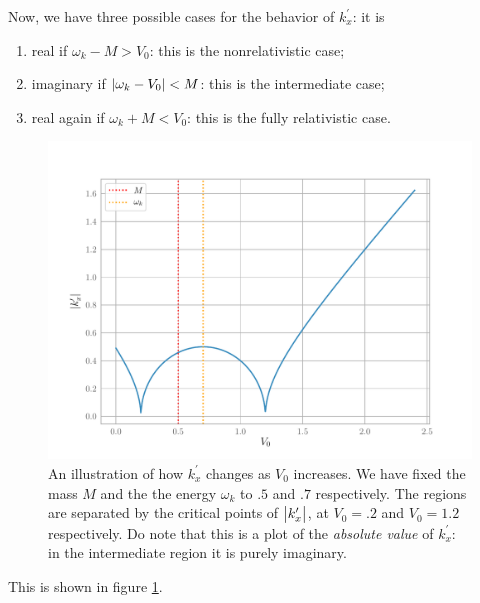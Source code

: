 \documentclass[main.tex]{subfiles}
\begin{document}
Now, we have three possible cases for the behavior of \(k_x^{\prime }\): it is 
\begin{enumerate}
  \item real if \(\omega_{k} - M > V_0 \): this is the nonrelativistic case;
  \item imaginary if \(\abs{\omega_{k} - V_0 } < M\): this is the intermediate case;
  \item real again if \(\omega_{k} + M < V_0 \): this is the fully relativistic case.
\end{enumerate}

\begin{figure}[ht]
\centering
\includegraphics[width=\textwidth]{figures/primed_momentum_potential.pdf}
\caption{An illustration of how \(k_x^{\prime }\) changes as \(V_0 \) increases. We have fixed the mass \(M\) and the the energy \(\omega_{k}\) to \(\num{.5}\) and \(\num{.7}\) respectively. The regions are separated by the critical points of \(\abs{k_x'}\), at \(V_0 = \num{.2}\) and \(V_0 = \num{1.2}\) respectively. Do note that this is a plot of the \emph{absolute value} of \(k_x^{\prime }\): in the intermediate region it is purely imaginary.}
\label{fig:primed_momentum_potential}
\end{figure}

This is shown in figure \ref{fig:primed_momentum_potential}.
 
\end{document}
